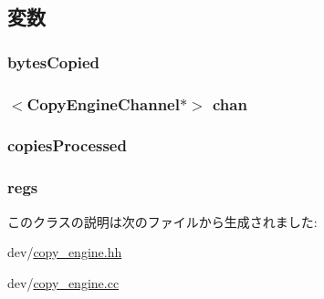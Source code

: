 \subsection{変数}
\hypertarget{classCopyEngine_a25b7da20ae9cf014c7806abf1bf929b3}{
\subsubsection[{bytesCopied}]{ {\bf bytesCopied}}}
\label{classCopyEngine_a25b7da20ae9cf014c7806abf1bf929b3}
\hypertarget{classCopyEngine_a2fa0132c83d16e1e404f54278dcf94c4}{
\subsubsection[{chan}]{$<${\bf CopyEngineChannel}$\ast$$>$ {\bf chan}}}
\label{classCopyEngine_a2fa0132c83d16e1e404f54278dcf94c4}
\hypertarget{classCopyEngine_a2c7c96445b0cb37f72b61dae4d2c541d}{
\subsubsection[{copiesProcessed}]{ {\bf copiesProcessed}}}
\label{classCopyEngine_a2c7c96445b0cb37f72b61dae4d2c541d}
\hypertarget{classCopyEngine_ac3a32787c71b25fdee473de0804efa29}{
\subsubsection[{regs}]{ {\bf regs}}}
\label{classCopyEngine_ac3a32787c71b25fdee473de0804efa29}


このクラスの説明は次のファイルから生成されました:\begin{DoxyCompactItemize}
\item 
dev/\hyperlink{copy__engine_8hh}{copy\_\-engine.hh}\item 
dev/\hyperlink{copy__engine_8cc}{copy\_\-engine.cc}\end{DoxyCompactItemize}
